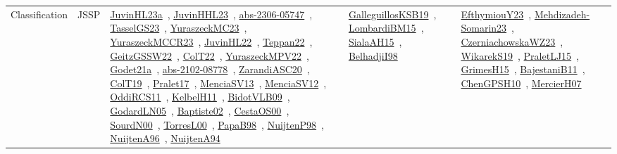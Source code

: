 {\begin{longtable}{lp{3cm}>{\raggedright\arraybackslash}p{6cm}>{\raggedright\arraybackslash}p{6cm}>{\raggedright\arraybackslash}p{8cm}}
\index{JSSP}\index{Classification!JSSP}Classification & JSSP & \href{../works/JuvinHL23a.pdf}{JuvinHL23a}~\cite{JuvinHL23a}, \href{../works/JuvinHHL23.pdf}{JuvinHHL23}~\cite{JuvinHHL23}, \href{../works/abs-2306-05747.pdf}{abs-2306-05747}~\cite{abs-2306-05747}, \href{../works/TasselGS23.pdf}{TasselGS23}~\cite{TasselGS23}, \href{../works/YuraszeckMC23.pdf}{YuraszeckMC23}~\cite{YuraszeckMC23}, \href{../works/YuraszeckMCCR23.pdf}{YuraszeckMCCR23}~\cite{YuraszeckMCCR23}, \href{../works/JuvinHL22.pdf}{JuvinHL22}~\cite{JuvinHL22}, \href{../works/Teppan22.pdf}{Teppan22}~\cite{Teppan22}, \href{../works/GeitzGSSW22.pdf}{GeitzGSSW22}~\cite{GeitzGSSW22}, \href{../works/ColT22.pdf}{ColT22}~\cite{ColT22}, \href{../works/YuraszeckMPV22.pdf}{YuraszeckMPV22}~\cite{YuraszeckMPV22}, \href{../works/Godet21a.pdf}{Godet21a}~\cite{Godet21a}, \href{../works/abs-2102-08778.pdf}{abs-2102-08778}~\cite{abs-2102-08778}, \href{../works/ZarandiASC20.pdf}{ZarandiASC20}~\cite{ZarandiASC20}, \href{../works/ColT19.pdf}{ColT19}~\cite{ColT19}, \href{../works/Pralet17.pdf}{Pralet17}~\cite{Pralet17}, \href{../works/MenciaSV13.pdf}{MenciaSV13}~\cite{MenciaSV13}, \href{../works/MenciaSV12.pdf}{MenciaSV12}~\cite{MenciaSV12}, \href{../works/OddiRCS11.pdf}{OddiRCS11}~\cite{OddiRCS11}, \href{../works/KelbelH11.pdf}{KelbelH11}~\cite{KelbelH11}, \href{../works/BidotVLB09.pdf}{BidotVLB09}~\cite{BidotVLB09}, \href{../works/GodardLN05.pdf}{GodardLN05}~\cite{GodardLN05}, \href{../works/Baptiste02.pdf}{Baptiste02}~\cite{Baptiste02}, \href{../works/CestaOS00.pdf}{CestaOS00}~\cite{CestaOS00}, \href{../works/SourdN00.pdf}{SourdN00}~\cite{SourdN00}, \href{../works/TorresL00.pdf}{TorresL00}~\cite{TorresL00}, \href{../works/PapaB98.pdf}{PapaB98}~\cite{PapaB98}, \href{../works/NuijtenP98.pdf}{NuijtenP98}~\cite{NuijtenP98}, \href{../works/NuijtenA96.pdf}{NuijtenA96}~\cite{NuijtenA96}, \href{../works/NuijtenA94.pdf}{NuijtenA94}~\cite{NuijtenA94} & \href{../works/GalleguillosKSB19.pdf}{GalleguillosKSB19}~\cite{GalleguillosKSB19}, \href{../works/LombardiBM15.pdf}{LombardiBM15}~\cite{LombardiBM15}, \href{../works/SialaAH15.pdf}{SialaAH15}~\cite{SialaAH15}, \href{../works/BelhadjiI98.pdf}{BelhadjiI98}~\cite{BelhadjiI98} & \href{../works/EfthymiouY23.pdf}{EfthymiouY23}~\cite{EfthymiouY23}, \href{../works/Mehdizadeh-Somarin23.pdf}{Mehdizadeh-Somarin23}~\cite{Mehdizadeh-Somarin23}, \href{../works/CzerniachowskaWZ23.pdf}{CzerniachowskaWZ23}~\cite{CzerniachowskaWZ23}, \href{../works/WikarekS19.pdf}{WikarekS19}~\cite{WikarekS19}, \href{../works/PraletLJ15.pdf}{PraletLJ15}~\cite{PraletLJ15}, \href{../works/GrimesH15.pdf}{GrimesH15}~\cite{GrimesH15}, \href{../works/BajestaniB11.pdf}{BajestaniB11}~\cite{BajestaniB11}, \href{../works/ChenGPSH10.pdf}{ChenGPSH10}~\cite{ChenGPSH10}, \href{../works/MercierH07.pdf}{MercierH07}~\cite{MercierH07}\\

\end{longtable}}

